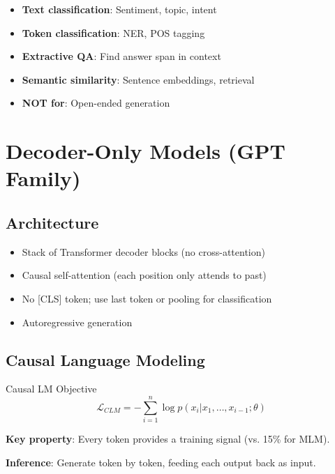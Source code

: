 \begin{itemize}
    \item \textbf{Text classification}: Sentiment, topic, intent
    \item \textbf{Token classification}: NER, POS tagging
    \item \textbf{Extractive QA}: Find answer span in context
    \item \textbf{Semantic similarity}: Sentence embeddings, retrieval
    \item \textbf{NOT for}: Open-ended generation
\end{itemize}

\section{Decoder-Only Models (GPT Family)}
\label{sec:decoder_only}

\subsection{Architecture}

\begin{itemize}
    \item Stack of Transformer decoder blocks (no cross-attention)
    \item Causal self-attention (each position only attends to past)
    \item No [CLS] token; use last token or pooling for classification
    \item Autoregressive generation
\end{itemize}

\subsection{Causal Language Modeling}

\begin{mathresult}{Causal LM Objective}
\begin{equation}
\mathcal{L}_{CLM} = -\sum_{i=1}^{n} \log p(x_i | x_1, \ldots, x_{i-1}; \theta)
\end{equation}
\end{mathresult}

\textbf{Key property}: Every token provides a training signal (vs. 15\% for MLM).

\textbf{Inference}: Generate token by token, feeding each output back as input.

